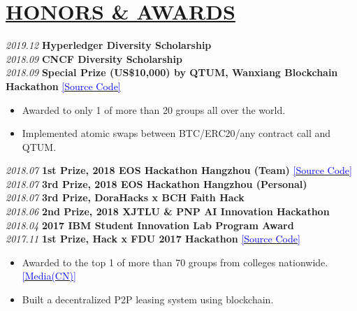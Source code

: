 \documentclass[11pt]{article}
\begin{document}
%
\section*{\centering\underline{HONORS \& AWARDS}}
\noindent\textit{2019.12} \textbf{Hyperledger Diversity Scholarship}\\
\noindent\textit{2018.09} \textbf{CNCF Diversity Scholarship}\\
\noindent\textit{2018.09} \textbf{Special Prize (US\$10,000) by QTUM, Wanxiang Blockchain Hackathon} \href{https://github.com/PRIEWIENV/QtumSwap}{\textcolor{blue}{[Source Code]}}
    \begin{itemize}[noitemsep, topsep=0pt, partopsep=0pt, leftmargin=5em, parsep=0pt]
        \item Awarded to only 1 of more than 20 groups all over the world.
        \item Implemented atomic swaps between BTC/ERC20/any contract call and QTUM.
    \end{itemize}
\noindent\textit{2018.07} \textbf{1st Prize, 2018 EOS Hackathon Hangzhou (Team)} \href{https://github.com/Acappella-dream}{\textcolor{blue}{[Source Code]}}\\
\noindent\textit{2018.07} \textbf{3rd Prize, 2018 EOS Hackathon Hangzhou (Personal)}\\
\noindent\textit{2018.07} \textbf{3rd Prize, DoraHacks x BCH Faith Hack}\\
\noindent\textit{2018.06} \textbf{2nd Prize, 2018 XJTLU \& PNP AI Innovation Hackathon}\\
\noindent\textit{2018.04} \textbf{2017 IBM Student Innovation Lab Program Award}\\
\noindent\textit{2017.11} \textbf{1st Prize, Hack x FDU 2017 Hackathon} \href{https://github.com/dexhunter/hackxfdu-DSharing}{\textcolor{blue}{[Source Code]}}
    \begin{itemize}[noitemsep, topsep=0pt, partopsep=0pt, leftmargin=5em, parsep=0pt]
        \item Awarded to the top 1 of more than 70 groups from colleges nationwide. \href{https://archive.is/FzYVh}{\textcolor{blue}{[Media(CN)]}}
        \item Built a decentralized P2P leasing system using blockchain. 
    \end{itemize} 
\vspace{20mm} %


%

\end{document}

